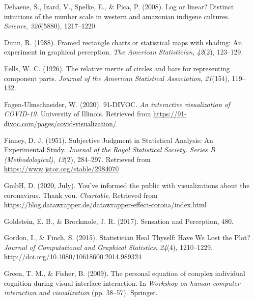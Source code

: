 \documentclass[print]{nuthesis}
\newlength{\cslhangindent}
\newenvironment{CSLReferences}%
{\setlength{\parindent}{0pt}%
\everypar{\setlength{\hangindent}{\cslhangindent}}\ignorespaces}%
{\par}
\begin{document}
\begin{CSLReferences}{1}{0}
\leavevmode\hypertarget{ref-dehaene2008log}{}%
Dehaene, S., Izard, V., Spelke, E., \& Pica, P. (2008). Log or linear? Distinct intuitions of the number scale in western and amazonian indigene cultures. \emph{Science}, \emph{320}(5880), 1217--1220.

\leavevmode\hypertarget{ref-dunn1988framed}{}%
Dunn, R. (1988). Framed rectangle charts or statistical maps with shading: An experiment in graphical perception. \emph{The American Statistician}, \emph{42}(2), 123--129.

\leavevmode\hypertarget{ref-eells1926relative}{}%
Eells, W. C. (1926). The relative merits of circles and bars for representing component parts. \emph{Journal of the American Statistical Association}, \emph{21}(154), 119--132.

\leavevmode\hypertarget{ref-fagen-ulmschneider_2020}{}%
Fagen-Ulmschneider, W. (2020). 91-DIVOC. \emph{An interactive visualization of COVID-19}. University of Illinois. Retrieved from \url{https://91-divoc.com/pages/covid-visualization/}

\leavevmode\hypertarget{ref-finney_subjective_1951}{}%
Finney, D. J. (1951). Subjective {Judgment} in {Statistical} {Analysis}: {An} {Experimental} {Study}. \emph{Journal of the Royal Statistical Society. Series B (Methodological)}, \emph{13}(2), 284--297. Retrieved from \url{https://www.jstor.org/stable/2984070}

\leavevmode\hypertarget{ref-gmbh_youve_2020}{}%
GmbH, D. (2020, July). You've informed the public with visualizations about the coronavirus. {Thank} you. \emph{Chartable}. Retrieved from \url{https://blog.datawrapper.de/datawrapper-effect-corona/index.html}

\leavevmode\hypertarget{ref-goldstein_sensation_2017}{}%
Goldstein, E. B., \& Brockmole, J. R. (2017). Sensation and {Perception}, 480.

\leavevmode\hypertarget{ref-gordon_statistician_2015}{}%
Gordon, I., \& Finch, S. (2015). Statistician {Heal} {Thyself}: {Have} {We} {Lost} the {Plot}? \emph{Journal of Computational and Graphical Statistics}, \emph{24}(4), 1210--1229. http://doi.org/\href{https://doi.org/10.1080/10618600.2014.989324}{10.1080/10618600.2014.989324}

\leavevmode\hypertarget{ref-green2009personal}{}%
Green, T. M., \& Fisher, B. (2009). The personal equation of complex individual cognition during visual interface interaction. In \emph{Workshop on human-computer interaction and visualization} (pp. 38--57). Springer.


\end{CSLReferences}
\end{document}
